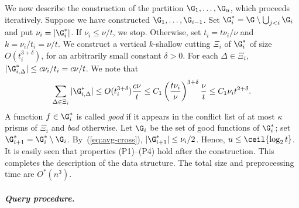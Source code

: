 %
We now describe the construction of the partition $\G_1, \ldots, \G_u$, which proceeds
iteratively. Suppose we have constructed $\G_1, \ldots, \G_{i-1}$. Set 
$\G_i^* = \G \setminus \bigcup_{j < i} \G_i$ and put $\nu_i = |\G_i^*|$. 
If $\nu_i \le \nu/t$, we stop. Otherwise, set $t_i = t\nu_i/\nu$ and $k=\nu_i/t_i=\nu/t$.
%
We construct a vertical $k$-shallow cutting $\Xi_i$ of $\G_i^*$ of size $O(t_i^{3+\delta})$,
for an arbitrarily small constant $\delta>0$. 
For each $\Delta\in \Xi_i$, $|\G_{i,\Delta}^*| \le c\nu_i/t_i = c\nu/t$. We note that
\begin{equation}
\label{eq:avg-cross}
\sum_{\Delta\in\Xi_i} |\G_{i,\Delta}^*| \le O(t_i^{3+\delta}) \frac{c\nu}{t} 
\le C_1 \left ( \frac{t\nu_i}{\nu}\right)^{3+\delta} \frac{\nu}{t} 
\le C_1 \nu_i t^{2+\delta} .
\end{equation}
A function $f \in \G_i^*$ is called \emph{good} if it appears in the conflict list of at 
most $\kappa$ prisms of $\Xi_i$ and \emph{bad} otherwise. 
Let $\G_i$ be the set of good functions of $\G_i^*$; set $\G_{i+1}^* = \G_i^*\setminus \G_i$.
By~(\ref{eq:avg-cross}), $|\G_{i+1}^*| \le \nu_i/2$. Hence, $u \le \ceil{\log_2 t}$. 
It is easily seen that properties (P1)--(P4) hold after the construction.
This completes the description of the data structure. The total size and preprocessing time are $O^*(n^3)$.
%
%
\ifsocgproc 
\subparagraph*{Query procedure.}
\else
